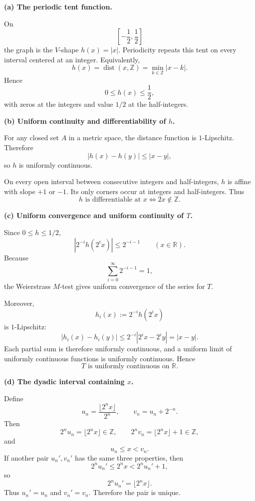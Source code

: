 \begin{solution}

\par\smallskip\noindent\textbf{(a) The periodic tent function.}

On
\[
\left[-\frac12,\frac12\right]
\]
the graph is the \(V\)-shape \(h(x)=|x|\). Periodicity repeats this tent
on every interval centered at an integer. Equivalently,
\[
\boxed{
h(x)=\operatorname{dist}(x,\mathbb Z)
=
\min_{k\in\mathbb Z}|x-k|.}
\]
Hence
\[
0\le h(x)\le\frac12,
\]
with zeros at the integers and value \(1/2\) at the half-integers.

\par\smallskip\noindent\textbf{(b) Uniform continuity and differentiability of \(h\).}

For any closed set \(A\) in a metric space, the distance function is
\(1\)-Lipschitz. Therefore
\[
|h(x)-h(y)|
\le
|x-y|,
\]
so \(h\) is uniformly continuous.

On every open interval between consecutive integers and half-integers,
\(h\) is affine with slope \(+1\) or \(-1\). Its only corners occur at
integers and half-integers. Thus
\[
\boxed{
h\text{ is differentiable at }x
\iff
2x\notin\mathbb Z.}
\]

\par\smallskip\noindent\textbf{(c) Uniform convergence and uniform continuity of \(T\).}

Since \(0\le h\le1/2\),
\[
\left|
2^{-i}h(2^i x)
\right|
\le
2^{-i-1}
\qquad
(x\in\mathbb R).
\]
Because
\[
\sum_{i=0}^{\infty}2^{-i-1}=1,
\]
the Weierstrass \(M\)-test gives uniform convergence of the series for
\(T\).

Moreover,
\[
h_i(x):=2^{-i}h(2^i x)
\]
is \(1\)-Lipschitz:
\[
|h_i(x)-h_i(y)|
\le
2^{-i}|2^i x-2^i y|
=
|x-y|.
\]
Each partial sum is therefore uniformly continuous, and a uniform limit
of uniformly continuous functions is uniformly continuous. Hence
\[
\boxed{T\text{ is uniformly continuous on }\mathbb R.}
\]

\par\smallskip\noindent\textbf{(d) The dyadic interval containing \(x\).}

Define
\[
u_n
=
\frac{\lfloor2^n x\rfloor}{2^n},
\qquad
v_n
=
u_n+2^{-n}.
\]
Then
\[
2^nu_n=\lfloor2^nx\rfloor\in\mathbb Z,
\qquad
2^nv_n=\lfloor2^nx\rfloor+1\in\mathbb Z,
\]
and
\[
u_n\le x<v_n.
\]
If another pair \(u_n',v_n'\) has the same three properties, then
\[
2^n u_n'
\le
2^n x
<
2^n u_n'+1,
\]
so
\[
2^nu_n'=\lfloor2^nx\rfloor.
\]
Thus \(u_n'=u_n\) and \(v_n'=v_n\). Therefore the pair is unique.


\end{solution}
